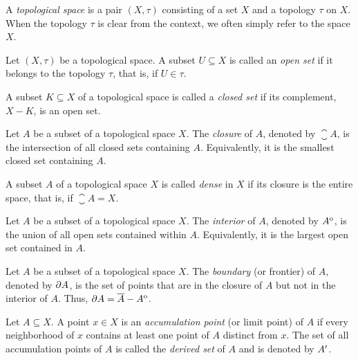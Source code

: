 \begin{definition*}
    A \emph{topological space} is a pair $(X, \tau)$ consisting of a set $X$ and
    a topology $\tau$ on $X$. When the topology $\tau$ is clear from the
    context, we often simply refer to the space $X$.
\end{definition*}

\begin{definition*}
    Let $(X, \tau)$ be a topological space. A subset $U \subseteq X$ is called
    an \emph{open set} if it belongs to the topology $\tau$, that is, if $U \in
    \tau$.
\end{definition*}

\begin{definition*}
    A subset $K \subseteq X$ of a topological space is called a \emph{closed
    set} if its complement, $X - K$, is an open set.
\end{definition*}

\begin{definition*}[Closure]
    Let $A$ be a subset of a topological space $X$. The \emph{closure} of $A$,
    denoted by $\closure{A}$, is the intersection of all closed sets containing
    $A$. Equivalently, it is the smallest closed set containing $A$.
\end{definition*}

\begin{definition*}
    A subset $A$ of a topological space $X$ is called \emph{dense} in $X$ if its
    closure is the entire space, that is, if $\closure{A} = X$.
\end{definition*}

\begin{definition*}[Interior]
    Let $A$ be a subset of a topological space $X$. The \emph{interior} of $A$,
    denoted by ${A}^{\mathrm{o}}$, is the union of all open
    sets contained within $A$. Equivalently, it is the largest open set contained
    in $A$.
\end{definition*}

\begin{definition*}[Boundary]
    Let $A$ be a subset of a topological space $X$. The \emph{boundary} (or
    frontier) of $A$, denoted by $\partial {A}$, is the set of points that are in
    the closure of $A$ but not in the interior of $A$. Thus, $\partial {A} =
    \overline{A} - {A}^{\mathrm{o}}$.
\end{definition*}

\begin{definition*}
    Let $A \subseteq X$. A point $x \in X$ is an \emph{accumulation point} (or
    limit point) of $A$ if every neighborhood of $x$ contains at least one point
    of $A$ distinct from $x$. The set of all accumulation points of $A$ is
    called the \emph{derived set} of $A$ and is denoted by ${A}'$.
\end{definition*}

